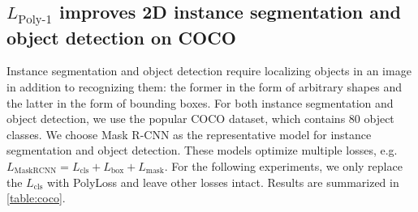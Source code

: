 \vspace{-8pt}
\subsection{\texorpdfstring{$L_{\text{Poly-1}}$}{} improves 2D instance segmentation and object detection on COCO}
\vspace{-5pt}

Instance segmentation and object detection require localizing objects in an image in addition to recognizing them: the former in the form of arbitrary shapes and the latter in the form of bounding boxes. 
For both instance segmentation and object detection, we use the popular COCO \citep{lin2014microsoft} dataset, which contains 80 object classes.
We choose Mask R-CNN \citep{he2017mask} as the representative model for instance segmentation and object detection.
These models optimize multiple losses, e.g. $L_{\text{MaskRCNN}} = L_{\text{cls}} + L_{\text{box}} + L_{\text{mask}}$. For the following experiments, we only replace the $L_{\text{cls}}$ with PolyLoss and leave other losses intact. Results are summarized in \autoref{table:coco}.

\begin{table}[!t]\centering
\vspace{-20pt}
\vspace{-5pt}
\caption{\textbf{PolyLoss improves detection results on COCO \textit{validation set}.} Bounding box and instance segmentation mask average-precision (AP) and average-recall (AR) are reported for Mask R-CNN model with a ResNet-50 backbone. Mean and stdev of three runs are reported. }
\label{table:coco}
\vspace{-18pt}
\end{table}


